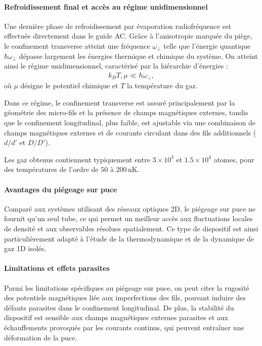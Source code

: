 \paragraph{Refroidissement final et accès au régime unidimensionnel}
Une dernière phase de refroidissement par évaporation radiofréquence est effectuée directement dans le guide \gls{AC}. Grâce à l’anisotropie marquée du piège, le confinement transverse atteint une fréquence \(\omega_\perp\) telle que l’énergie quantique \(\hbar \omega_\perp\) dépasse largement les énergies thermique et chimique du système. On atteint ainsi le régime unidimensionnel, caractérisé par la hiérarchie d’énergies :
\begin{eqnarray*}
	k_B T, \mu \ll \hbar \omega_\perp,	
\end{eqnarray*}
où \(\mu\) désigne le potentiel chimique et \(T\) la température du gaz.

\medskip

Dans ce régime, le confinement transverse est assuré principalement par la géométrie des micro-fils et la présence de champs magnétiques externes, tandis que le confinement longitudinal, plus faible, est ajustable via une combinaison de champs magnétiques externes et de courants circulant dans des fils additionnels ($d/d'$ et $D/D'$). 

\medskip

Les gaz obtenus contiennent typiquement entre \(3\times 10^3\) et \(1.5\times 10^4\) atomes, pour des températures de l’ordre de \(50\) à \(200\,\mathrm{nK}\). %



\paragraph{Avantages du piégeage sur puce}
Comparé aux systèmes utilisant des réseaux optiques 2D, le piégeage sur puce ne fournit qu’un seul tube, ce qui permet un meilleur accès aux fluctuations locales de densité et aux observables résolues spatialement. Ce type de dispositif est ainsi particulièrement adapté à l'étude de la thermodynamique et de la dynamique de gaz 1D isolés.

\paragraph{Limitations et effets parasites}
Parmi les limitations spécifiques au piégeage sur puce, on peut citer la rugosité des potentiels magnétiques liée aux imperfections des fils, pouvant induire des défauts parasites dans le confinement longitudinal. De plus, la stabilité du dispositif est sensible aux champs magnétiques externes parasites et aux échauffements provoqués par les courants continus, qui peuvent entraîner une déformation de la puce.



